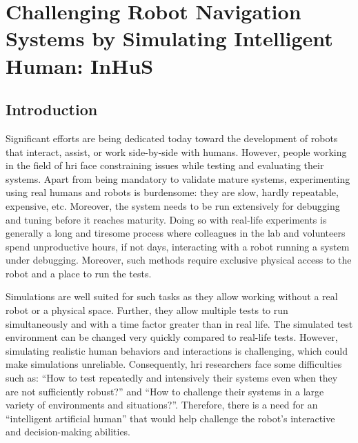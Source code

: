 \ifdefined{}
\else
\setcounter{chapter}{6} %
\dominitoc
\faketableofcontents
\fi

\chapter{Challenging Robot Navigation Systems by Simulating Intelligent Human: InHuS}
\label{chap:7}
\minitoc


\section{Introduction}


Significant efforts are being dedicated today toward the development of robots that interact, assist, or work side-by-side with humans. However, people working in the field of \acrfull{hri} face constraining issues while testing and evaluating their systems. 
Apart from being mandatory to validate mature systems, experimenting using real humans and robots is burdensome: they are slow, hardly repeatable, expensive, etc. Moreover, the system needs to be run extensively for debugging and tuning before it reaches maturity. Doing so with real-life experiments is generally a long and tiresome process where colleagues in the lab and volunteers spend unproductive hours, if not days, interacting with a robot running a system under debugging. Moreover, such methods require exclusive physical access to the robot and a place to run the tests.

Simulations are well suited for such tasks as they allow working without a real robot or a physical space. Further, they allow multiple tests to run simultaneously and with a time factor greater than in real life. The simulated test environment can be changed very quickly compared to real-life tests. However, simulating realistic human behaviors and interactions is challenging, which could make simulations unreliable. Consequently, \acrshort{hri} researchers face some difficulties such as: ``How to test repeatedly and intensively their systems even when they are not sufficiently robust?'' and ``How to challenge their systems in a large variety of environments and situations?''. Therefore, there is a need for an ``intelligent artificial human'' that would help challenge the robot's interactive and decision-making abilities. 

